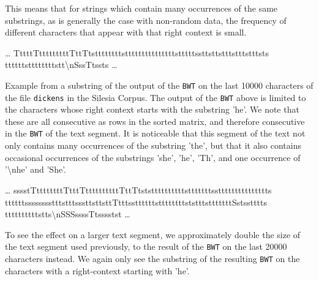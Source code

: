 \documentclass{article}
\begin{document}
This means that for strings which contain many occurrences of the same substrings, as is generally the case with non-random data, the frequency of different characters that appear with that right context is small.
\begin{center}
    \dots
    TttttTtttttttttTttTts\textvisiblespace ttttt\textvisiblespace ttts\textvisiblespace tttttttttttttttsttttts\textvisiblespace s\textvisiblespace t\textvisiblespace tsttstttstttstttsts \\
    tt\textvisiblespace tt\textvisiblespace tt\textvisiblespace s\textvisiblespace tttttt\textvisiblespace ttstt\textvisiblespace \textbackslash nSss\textvisiblespace Ttssts
    \dots
\end{center}

Example from a substring of the output of the \texttt{BWT} on the last 10000 characters of the file \texttt{dickens} in the Silesia Corpus. The output of the \texttt{BWT} above is limited to the characters whose right context starts with the substring 'he\textvisiblespace'. We note that these are all consecutive as rows in the sorted matrix, and therefore consecutive in the \texttt{BWT} of the text segment. It is noticeable that this segment of the text not only contains many occurrences of the substring 'the\textvisiblespace', but that it also contains occasional occurrences of the substrings 'she\textvisiblespace', '\textvisiblespace he\textvisiblespace', 'Th\textvisiblespace', and one occurrence of '\textbackslash nhe\textvisiblespace' and 'She\textvisiblespace'.
\begin{center}
    \dots
    sssstTttttttttTtttTttttttttttTttTtstst\textvisiblespace tttttt\textvisiblespace \textvisiblespace tttst\textvisiblespace ttttttssttttttttttttttts\textvisiblespace \\
    ttttttssss\textvisiblespace ssss\textvisiblespace ttts\textvisiblespace tttsssttsttsttTtttssttttttsttttttttststtt\textvisiblespace sttttt\textvisiblespace tt\textvisiblespace Sst\textvisiblespace sstttts \\
    tttttt\textvisiblespace ttttstt\textvisiblespace s\textbackslash nSSS\textvisiblespace ssss\textvisiblespace \textvisiblespace Ttsssstst
    \dots
\end{center}
To see the effect on a larger text segment, we approximately double the size of the text segment used previously, to the result of the \texttt{BWT} on the last 20000 characters instead. We again only see the substring of the resulting \texttt{BWT} on the characters with a right-context starting with 'he\textvisiblespace'.
\end{document}
